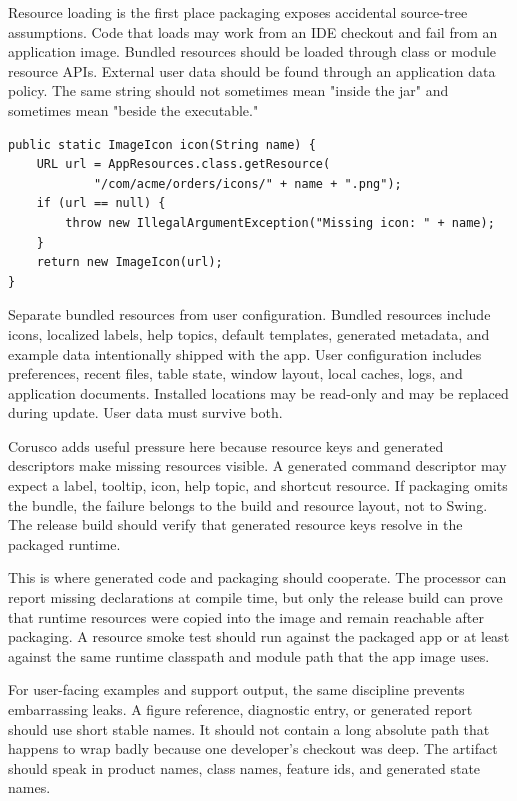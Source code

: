 Resource loading is the first place packaging exposes accidental source-tree assumptions. Code that loads  may work from an IDE checkout and fail from an application image. Bundled resources should be loaded through class or module resource APIs. External user data should be found through an application data policy. The same string should not sometimes mean "inside the jar" and sometimes mean "beside the executable."

\begin{lstlisting}[caption={Classpath/module-safe icon loading.}]
public static ImageIcon icon(String name) {
    URL url = AppResources.class.getResource(
            "/com/acme/orders/icons/" + name + ".png");
    if (url == null) {
        throw new IllegalArgumentException("Missing icon: " + name);
    }
    return new ImageIcon(url);
}
\end{lstlisting}

Separate bundled resources from user configuration. Bundled resources include icons, localized labels, help topics, default templates, generated metadata, and example data intentionally shipped with the app. User configuration includes preferences, recent files, table state, window layout, local caches, logs, and application documents. Installed locations may be read-only and may be replaced during update. User data must survive both.

Corusco adds useful pressure here because resource keys and generated descriptors make missing resources visible. A generated command descriptor may expect a label, tooltip, icon, help topic, and shortcut resource. If packaging omits the bundle, the failure belongs to the build and resource layout, not to Swing. The release build should verify that generated resource keys resolve in the packaged runtime.

This is where generated code and packaging should cooperate. The processor can report missing declarations at compile time, but only the release build can prove that runtime resources were copied into the image and remain reachable after packaging. A resource smoke test should run against the packaged app or at least against the same runtime classpath and module path that the app image uses.

For user-facing examples and support output, the same discipline prevents embarrassing leaks. A figure reference, diagnostic entry, or generated report should use short stable names. It should not contain a long absolute path that happens to wrap badly because one developer's checkout was deep. The artifact should speak in product names, class names, feature ids, and generated state names.

